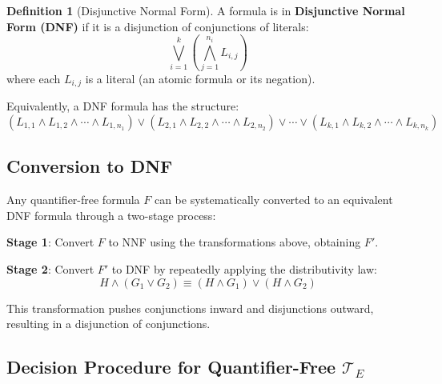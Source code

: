 \documentclass[11pt,a4paper]{article}
\theoremstyle{definition}
\newtheorem{definition}{Definition}[section]
\theoremstyle{plain}
\theoremstyle{remark}
\begin{document}
\begin{tcolorbox}[colback=cyan!5!white,colframe=cyan!75!black,title=\textbf{Disjunctive Normal Form (DNF)}]
\begin{definition}[Disjunctive Normal Form]
A formula is in \textbf{Disjunctive Normal Form (DNF)} if it is a disjunction of conjunctions of literals:
\[
\bigvee_{i=1}^{k} \left( \bigwedge_{j=1}^{n_i} L_{i,j} \right)
\]
where each $L_{i,j}$ is a literal (an atomic formula or its negation).
\end{definition}
\end{tcolorbox}

Equivalently, a DNF formula has the structure:
\[
(L_{1,1} \wedge L_{1,2} \wedge \cdots \wedge L_{1,n_1}) \vee (L_{2,1} \wedge L_{2,2} \wedge \cdots \wedge L_{2,n_2}) \vee \cdots \vee (L_{k,1} \wedge L_{k,2} \wedge \cdots \wedge L_{k,n_k})
\]

\subsection{Conversion to DNF}

Any quantifier-free formula $F$ can be systematically converted to an equivalent DNF formula through a two-stage process:

\begin{center}
\end{center}

\textbf{Stage 1}: Convert $F$ to NNF using the transformations above, obtaining $F'$.

\textbf{Stage 2}: Convert $F'$ to DNF by repeatedly applying the distributivity law:
\[
H \wedge (G_1 \vee G_2) \equiv (H \wedge G_1) \vee (H \wedge G_2)
\]

This transformation pushes conjunctions inward and disjunctions outward, resulting in a disjunction of conjunctions.

\subsection{Decision Procedure for Quantifier-Free $\mathcal{T}_E$}
\end{document}
